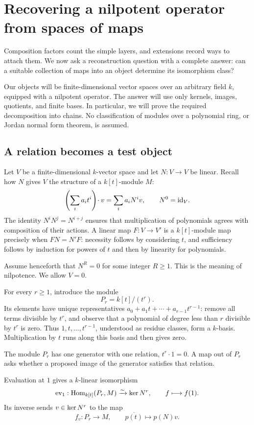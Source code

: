 \section{Recovering a nilpotent operator from spaces of maps}
\label{p:probes}

Composition factors count the simple layers, and extensions record ways to
attach them. We now ask a reconstruction question with a complete answer:
can a suitable collection of maps into an object determine its isomorphism
class?

Our objects will be finite-dimensional vector spaces over an arbitrary field
$k$, equipped with a nilpotent operator. The answer will use only kernels,
images, quotients, and finite bases. In particular, we will prove the required
decomposition into chains. No classification of modules over a polynomial
ring, or Jordan normal form theorem, is assumed.

\subsection{A relation becomes a test object}
\label{p:relation-probe}

Let $V$ be a finite-dimensional $k$-vector space and let $N:V\to V$ be linear.
Recall how $N$ gives $V$ the structure of a $k[t]$-module $M$:
\[
 \left(\sum_i a_it^i\right)\!\cdot v=\sum_i a_iN^iv,
 \qquad N^0=\mathrm{id}_V.
\]
The identity $N^iN^j=N^{i+j}$ ensures that multiplication of polynomials
agrees with composition of their actions. A linear map $F:V\to V'$ is a
$k[t]$-module map precisely when $FN=N'F$: necessity follows by considering
$t$, and sufficiency follows by induction for powers of $t$ and then by
linearity for polynomials.

Assume henceforth that $N^R=0$ for some integer $R\geq1$. This is the
meaning of nilpotence. We allow $V=0$.

For every $r\geq1$, introduce the module
\[
 P_r=k[t]/(t^r).
\]
Its elements have unique representatives
$a_0+a_1t+\cdots+a_{r-1}t^{r-1}$: remove all terms divisible by $t^r$, and
observe that a polynomial of degree less than $r$ divisible by $t^r$ is zero.
Thus $1,t,\ldots,t^{r-1}$, understood as residue classes, form a $k$-basis.
Multiplication by $t$ runs along this basis and then gives zero.

The module $P_r$ has one generator with one relation, $t^r\cdot1=0$.
A map out of $P_r$ asks whether a proposed image of the generator satisfies
that relation.

\begin{proposition}
\label{p:hom-kernel}
Evaluation at $1$ gives a $k$-linear isomorphism
\[
 \operatorname{ev}_1:\operatorname{Hom}_{k[t]}(P_r,M)\xrightarrow{\sim}\operatorname{ker} N^r,
 \qquad f\longmapsto f(1).
\]
Its inverse sends $v\in\operatorname{ker} N^r$ to the map
\[
 f_v:P_r\longrightarrow M,\qquad \overline{p(t)}\longmapsto p(N)v.
\]
\end{proposition}

